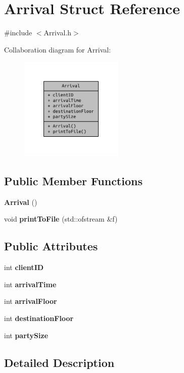 \section{Arrival Struct Reference}
\label{struct_arrival}


{\ttfamily \#include $<$Arrival.\+h$>$}



Collaboration diagram for Arrival\+:\nopagebreak
\begin{figure}[H]
\begin{center}
\leavevmode
\includegraphics[width=139pt]{struct_arrival__coll__graph}
\end{center}
\end{figure}
\subsection*{Public Member Functions}
\begin{DoxyCompactItemize}
\item 
{\bf Arrival} ()
\item 
void {\bf print\+To\+File} (std\+::ofstream \&f)
\end{DoxyCompactItemize}
\subsection*{Public Attributes}
\begin{DoxyCompactItemize}
\item 
int {\bf client\+I\+D}
\item 
int {\bf arrival\+Time}
\item 
int {\bf arrival\+Floor}
\item 
int {\bf destination\+Floor}
\item 
int {\bf party\+Size}
\end{DoxyCompactItemize}


\subsection{Detailed Description}


